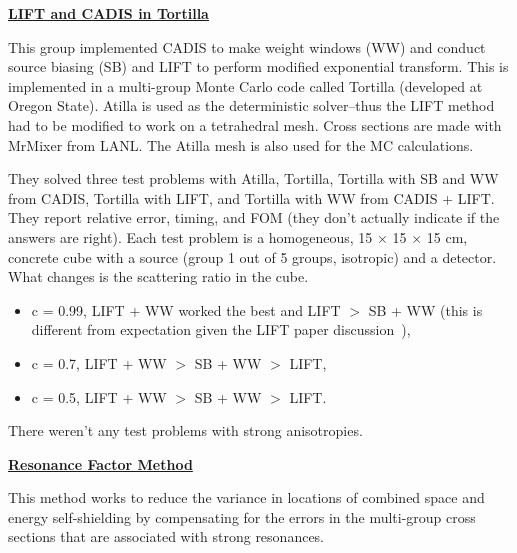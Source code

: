 \documentclass[12pt,twoside]{article}
\begin{document}
\vspace*{3em}
\begin{center}
\underline{\textbf{LIFT and CADIS in Tortilla}} \cite{Somasundaram2013}
\end{center}
This group implemented CADIS to make weight windows (WW) and conduct source biasing (SB) and LIFT to perform modified exponential transform. This is implemented in a multi-group Monte Carlo code called Tortilla (developed at Oregon State). Atilla is used as the deterministic solver--thus the LIFT method had to be modified to work on a tetrahedral mesh. Cross sections are made with MrMixer from LANL. The Atilla mesh is also used for the MC calculations. 

They solved three test problems with Atilla, Tortilla, Tortilla with SB and WW from CADIS, Tortilla with LIFT, and Tortilla with WW from CADIS + LIFT. They report relative error, timing, and FOM (they don't actually indicate if the answers are right). Each test problem is a homogeneous, 15 $\times$ 15 $\times$ 15 cm, concrete cube with a source (group 1 out of 5 groups, isotropic) and a detector. What changes is the scattering ratio in the cube. 

\begin{itemize}
  \item c = 0.99, LIFT + WW worked the best and LIFT $>$ SB + WW (this is different from expectation given the LIFT paper discussion~\cite{Turner1997a}),
  \item c = 0.7, LIFT + WW $>$ SB + WW $>$ LIFT,
  \item c = 0.5, LIFT + WW $>$ SB + WW $>$ LIFT.
\end{itemize} 
There weren't any test problems with strong anisotropies.



\vspace*{3em}
\begin{center}
\underline{\textbf{Resonance Factor Method}} \cite{Wilson2014}
\end{center}

This method works to reduce the variance in locations of combined space and energy self-shielding by compensating for the errors in the multi-group cross sections that are associated with strong resonances.  
\end{document}
